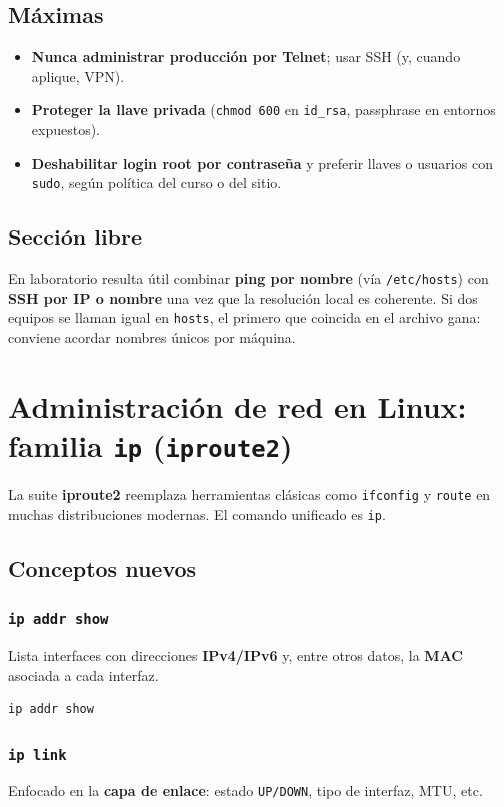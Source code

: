 \documentclass[11pt, letterpaper]{article}
\begin{document}
\subsection{Máximas}
\label{sec:org4dce017}
\begin{itemize}
\item \textbf{Nunca administrar producción por Telnet}; usar SSH (y, cuando aplique, VPN).
\item \textbf{Proteger la llave privada} (\texttt{chmod 600} en \texttt{id\_rsa}, passphrase en entornos expuestos).
\item \textbf{Deshabilitar login root por contraseña} y preferir llaves o usuarios con \texttt{sudo}, según política del curso o del sitio.
\end{itemize}
\subsection{Sección libre}
\label{sec:orga8f8e92}
En laboratorio resulta útil combinar \textbf{ping por nombre} (vía \texttt{/etc/hosts}) con \textbf{SSH por IP o nombre} una vez que la resolución local es coherente. Si dos equipos se llaman igual en \texttt{hosts}, el primero que coincida en el archivo gana: conviene acordar nombres únicos por máquina.
\section{Administración de red en Linux: familia \texttt{ip} (\texttt{iproute2})}
\label{sec:org09cf9fe}

La suite \textbf{iproute2} reemplaza herramientas clásicas como \texttt{ifconfig} y \texttt{route} en muchas distribuciones modernas. El comando unificado es \texttt{ip}.
\subsection{Conceptos nuevos}
\label{sec:org12754dc}

\subsubsection{\texttt{ip addr show}}
\label{sec:orgedf5895}
Lista interfaces con direcciones \textbf{IPv4/IPv6} y, entre otros datos, la \textbf{MAC} asociada a cada interfaz.

\begin{verbatim}
ip addr show
\end{verbatim}
\subsubsection{\texttt{ip link}}
\label{sec:orgd8b8a1c}
Enfocado en la \textbf{capa de enlace}: estado \texttt{UP/DOWN}, tipo de interfaz, MTU, etc.
\end{document}
